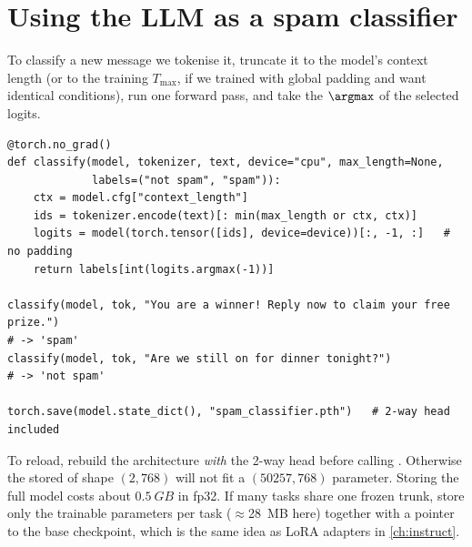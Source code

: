 \section{Using the LLM as a spam classifier}\label{sec:classify:use}

To classify a new message we tokenise it, truncate it to the model's context
length (or to the training $T_{\max}$, if we trained with global padding and want
identical conditions), run one forward pass, and take the $\argmax$ of the selected
logits.

\begin{lstlisting}[caption={Inference with the fine-tuned classifier.},label={lst:classify:infer}]
@torch.no_grad()
def classify(model, tokenizer, text, device="cpu", max_length=None,
             labels=("not spam", "spam")):
    ctx = model.cfg["context_length"]
    ids = tokenizer.encode(text)[: min(max_length or ctx, ctx)]
    logits = model(torch.tensor([ids], device=device))[:, -1, :]   # no padding
    return labels[int(logits.argmax(-1))]

classify(model, tok, "You are a winner! Reply now to claim your free prize.")
# -> 'spam'
classify(model, tok, "Are we still on for dinner tonight?")
# -> 'not spam'

torch.save(model.state_dict(), "spam_classifier.pth")   # 2-way head included
\end{lstlisting}

To reload, rebuild the architecture \emph{with} the 2-way head before calling
. Otherwise the stored  of shape
$(2, 768)$ will not fit a $(50257, 768)$ parameter. Storing the full model costs about
$\SI{0.5}{GB}$ in fp32. If many tasks share one frozen trunk, store only the
trainable parameters per task ($\approx$\SI{28}{MB} here) together with a pointer to
the base checkpoint, which is the same idea as LoRA adapters in \cref{ch:instruct}.

